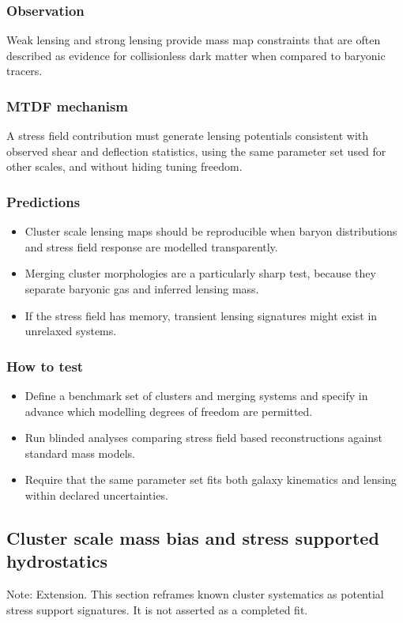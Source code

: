 \documentclass[11pt,a4paper]{article}
\begin{document}
\subsubsection{Observation}
Weak lensing and strong lensing provide mass map constraints that are often described as evidence for collisionless dark matter when compared to baryonic tracers.

\subsubsection{MTDF mechanism}
A stress field contribution must generate lensing potentials consistent with observed shear and deflection statistics, using the same parameter set used for other scales, and without hiding tuning freedom.

\subsubsection{Predictions}
\begin{itemize}
  \item Cluster scale lensing maps should be reproducible when baryon distributions and stress field response are modelled transparently.
  \item Merging cluster morphologies are a particularly sharp test, because they separate baryonic gas and inferred lensing mass.
  \item If the stress field has memory, transient lensing signatures might exist in unrelaxed systems.
\end{itemize}

\subsubsection{How to test}
\begin{itemize}
  \item Define a benchmark set of clusters and merging systems and specify in advance which modelling degrees of freedom are permitted.
  \item Run blinded analyses comparing stress field based reconstructions against standard mass models.
  \item Require that the same parameter set fits both galaxy kinematics and lensing within declared uncertainties.
\end{itemize}

\subsection{Cluster scale mass bias and stress supported hydrostatics}
\begin{mdframed}[linecolor=accent,linewidth=0.5pt,backgroundcolor=callout-bg,leftline=true,rightline=true,topline=true,bottomline=true,innerleftmargin=8pt,innerrightmargin=8pt,innertopmargin=6pt,innerbottommargin=6pt]
Note: Extension. This section reframes known cluster systematics as potential stress support signatures. It is not asserted as a completed fit.
\end{mdframed}
\end{document}
